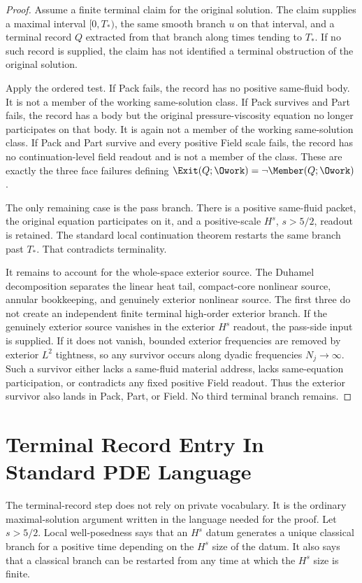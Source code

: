 \begin{proof}
Assume a finite terminal claim for the original solution.
The claim supplies a maximal interval \([0,T_*)\), the same smooth branch \(u\) on that interval, and a terminal record \(Q\) extracted from that branch along times tending to \(T_*\).
If no such record is supplied, the claim has not identified a terminal obstruction of the original solution.

Apply the ordered test.
If Pack fails, the record has no positive same-fluid body.
It is not a member of the working same-solution class.
If Pack survives and Part fails, the record has a body but the original pressure-viscosity equation no longer participates on that body.
It is again not a member of the working same-solution class.
If Pack and Part survive and every positive Field scale fails, the record has no continuation-level field readout and is not a member of the class.
These are exactly the three face failures defining \(\Exit(Q;\Owork)=\neg\Member(Q;\Owork)\).

The only remaining case is the pass branch.
There is a positive same-fluid packet, the original equation participates on it, and a positive-scale \(H^s\), \(s>5/2\), readout is retained.
The standard local continuation theorem restarts the same branch past \(T_*\).
That contradicts terminality.

It remains to account for the whole-space exterior source.
The Duhamel decomposition separates the linear heat tail, compact-core nonlinear source, annular bookkeeping, and genuinely exterior nonlinear source.
The first three do not create an independent finite terminal high-order exterior branch.
If the genuinely exterior source vanishes in the exterior \(H^s\) readout, the pass-side input is supplied.
If it does not vanish, bounded exterior frequencies are removed by exterior \(L^2\) tightness, so any survivor occurs along dyadic frequencies \(N_j\to\infty\).
Such a survivor either lacks a same-fluid material address, lacks same-equation participation, or contradicts any fixed positive Field readout.
Thus the exterior survivor also lands in Pack, Part, or Field.
No third terminal branch remains.
\end{proof}

\section{Terminal Record Entry In Standard PDE Language}

The terminal-record step does not rely on private vocabulary.
It is the ordinary maximal-solution argument written in the language needed for the proof.
Let \(s>5/2\).
Local well-posedness says that an \(H^s\) datum generates a unique classical branch for a positive time depending on the \(H^s\) size of the datum.
It also says that a classical branch can be restarted from any time at which the \(H^s\) size is finite.

